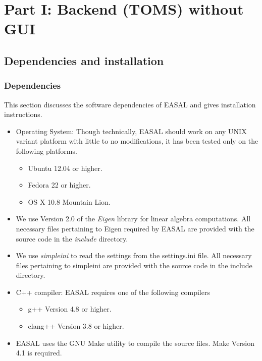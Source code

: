 \documentclass[10pt]{article}
\begin{document}
\section{Part I: Backend (TOMS) without GUI}
\label{part1}

\subsection{Dependencies and installation}
\label{dependency}
\subsubsection{Dependencies}
This section discusses the software dependencies of EASAL and gives installation instructions.

\begin{itemize} 
  \item Operating System: Though technically, EASAL should work on any UNIX variant platform with little to no modifications, it has been tested only on  the following platforms. 
  \begin{itemize}
	\item Ubuntu 12.04 or higher.
	\item Fedora 22 or higher.
	\item OS X 10.8 Mountain Lion.
\end{itemize}
  \item We use Version 2.0 of the \emph{Eigen} library for linear algebra
		  computations. All necessary files pertaining to Eigen required by
		  EASAL are provided with the source code in the \emph{include}
		  directory.  
   
  \item We use \emph{simpleini} to read the settings from the
		  settings.ini file. All necessary files pertaining to simpleini are
		  provided with the source code in the include directory.
   
  \item C++ compiler: EASAL requires one of the following compilers
		  \begin{itemize}
		  	\item g++ Version 4.8 or higher.
		  	\item clang++ Version 3.8 or higher.
		  \end{itemize}
		  
  \item EASAL uses the GNU Make utility to compile the source files. Make
		  Version 4.1 is required.
\end{itemize}
\end{document}
